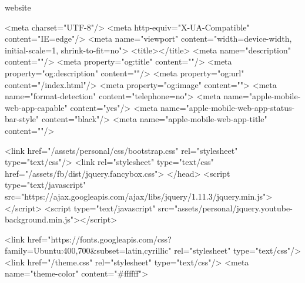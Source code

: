 \E website 

\meta \ml
<meta charset="UTF-8"/>
<meta http-equiv="X-UA-Compatible" content="IE=edge"/>
<meta name="viewport" content="width=device-width, initial-scale=1, shrink-to-fit=no">
<title>\pageTitle</title>
<meta name="description" content="\siteTit"/>
<meta property="og:title" content="\siteTit"/>
<meta property="og:description" content="\siteTit"/>
<meta property="og:url" content="\webAddress/index.html"/>
<meta property="og:image" content="\linkImage">
<meta name="format-detection" content="telephone=no">
<meta name="apple-mobile-web-app-capable" content="yes"/>
<meta name="apple-mobile-web-app-status-bar-style" content="black"/>
<meta name="apple-mobile-web-app-title" content="\pageTitle"/>
\fin

\prescripts \ml

<link href="/assets/personal/css/bootstrap.css" rel="stylesheet" type="text/css"/>
<link rel="stylesheet" type="text/css" href="/assets/fb/dist/jquery.fancybox.css">
</head>
<script type="text/javascript" src="https://ajax.googleapis.com/ajax/libs/jquery/1.11.3/jquery.min.js"></script>
<script type="text/javascript" src="assets/personal/jquery.youtube-background.min.js"></script>

\fin


\style \ml
<link href="https://fonts.googleapis.com/css?family=Ubuntu:400,700&subset=latin,cyrillic" rel="stylesheet" type="text/css"/>  
<link href="/theme.css" rel="stylesheet" type="text/css"/>
<meta name="theme-color" content="#ffffff">
\fin


\favicon \ml

